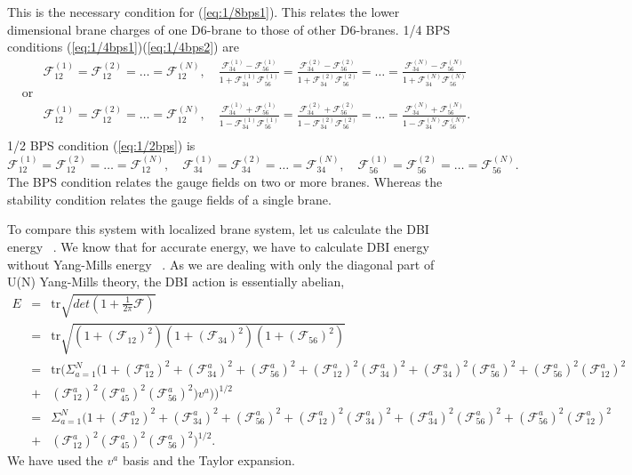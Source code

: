 \documentclass[a4paper,12pt]{article}
\newcommand{\tr}{\mbox{tr}}
\begin{document}
This is the necessary condition for (\ref{eq:1/8bps1}). This relates the lower dimensional brane charges of one D6-brane to those of other D6-branes. 1/4 BPS conditions (\ref{eq:1/4bps1})(\ref{eq:1/4bps2}) are
\begin{eqnarray}
& &\mathcal{F}_{12}^{(1)}=\mathcal{F}_{12}^{(2)}=\ldots=\mathcal{F}_{12}^{(N)}, \quad \frac{\mathcal{F}_{34}^{(1)}-\mathcal{F}_{56}^{(1)}}{1+\mathcal{F}_{34}^{(1)}\mathcal{F}_{56}^{(1)}}=\frac{\mathcal{F}_{34}^{(2)}-\mathcal{F}_{56}^{(2)}}{1+\mathcal{F}_{34}^{(2)}\mathcal{F}_{56}^{(2)}}=\ldots=\frac{\mathcal{F}_{34}^{(N)}-\mathcal{F}_{56}^{(N)}}{1+\mathcal{F}_{34}^{(N)}\mathcal{F}_{56}^{(N)}} \nonumber \\
&\mbox{or}& \nonumber \\
& &\mathcal{F}_{12}^{(1)}=\mathcal{F}_{12}^{(2)}=\ldots=\mathcal{F}_{12}^{(N)}, \quad \frac{\mathcal{F}_{34}^{(1)}+\mathcal{F}_{56}^{(1)}}{1-\mathcal{F}_{34}^{(1)}\mathcal{F}_{56}^{(1)}}=\frac{\mathcal{F}_{34}^{(2)}+\mathcal{F}_{56}^{(2)}}{1-\mathcal{F}_{34}^{(2)}\mathcal{F}_{56}^{(2)}}=\ldots=\frac{\mathcal{F}_{34}^{(N)}+\mathcal{F}_{56}^{(N)}}{1-\mathcal{F}_{34}^{(N)}\mathcal{F}_{56}^{(N)}}. \nonumber \\
\end{eqnarray}
1/2 BPS condition (\ref{eq:1/2bps}) is
\[
\mathcal{F}_{12}^{(1)}=\mathcal{F}_{12}^{(2)}=\ldots=\mathcal{F}_{12}^{(N)}, \quad \mathcal{F}_{34}^{(1)}=\mathcal{F}_{34}^{(2)}=\ldots=\mathcal{F}_{34}^{(N)}, \quad \mathcal{F}_{56}^{(1)}=\mathcal{F}_{56}^{(2)}=\ldots=\mathcal{F}_{56}^{(N)}. 
\] 
 The BPS condition relates the gauge fields on two or more branes. Whereas the stability condition relates the gauge fields of a single brane.
 
To compare this system with localized brane system, let us calculate the DBI energy ~\cite{dbi}. We know that for accurate energy, we have to calculate DBI energy without Yang-Mills energy ~\cite{born, h-t}.
As we are dealing with only the diagonal part of U(N) Yang-Mills theory, the DBI action is essentially abelian, 
\begin{eqnarray}
E &=& \tr\sqrt{det(1+\frac{1}{2\pi}\mathcal{F})} \nonumber \\
  &=& \tr\sqrt{(1+(\mathcal{F}_{12})^2)(1+(\mathcal{F}_{34})^2)(1+(\mathcal{F}_{56})^2)} \nonumber \\ 
  &=& \tr(\Sigma_{a=1}^N (1+(\mathcal{F}_{12}^a)^2 +(\mathcal{F}_{34}^a)^2 +(\mathcal{F}_{56}^a)^2 + (\mathcal{F}_{12}^a)^2(\mathcal{F}_{34}^a)^2 + (\mathcal{F}_{34}^a)^2(\mathcal{F}_{56}^a)^2 + (\mathcal{F}_{56}^a)^2(\mathcal{F}_{12}^a)^2 \nonumber \\
  &+& (\mathcal{F}_{12}^a)^2(\mathcal{F}_{45}^a)^2(\mathcal{F}_{56}^a)^2)v^a))^{1/2} \nonumber \\
  &=& \Sigma_{a=1}^N (1+(\mathcal{F}_{12}^a)^2 +(\mathcal{F}_{34}^a)^2 +(\mathcal{F}_{56}^a)^2 + (\mathcal{F}_{12}^a)^2(\mathcal{F}_{34}^a)^2 + (\mathcal{F}_{34}^a)^2(\mathcal{F}_{56}^a)^2 + (\mathcal{F}_{56}^a)^2(\mathcal{F}_{12}^a)^2 \nonumber\\
  &+& (\mathcal{F}_{12}^a)^2(\mathcal{F}_{45}^a)^2(\mathcal{F}_{56}^a)^2)^{1/2}. \label{eq:dbi}
\end{eqnarray}
We have used the $v^a$ basis and the Taylor expansion.
\end{document}
